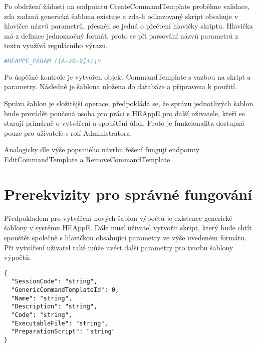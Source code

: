 Po obdržení žádosti na endpointu CreateCommandTemplate proběhne validace, zda zadaná generická šablona existuje a zda-li odkazovaný skript obsahuje v hlavičce názvů parametrů, přesněji se jedná o přečtení hlavičky skriptu. Hlavička má z definice jednoznačný formát, proto se při parsování názvů parametrů z textu využívá regulárního výrazu.


\begin{lstlisting}[language=bash, caption={Regurální výraz pro parsování názvů parametrů}]
                                #HEAPPE_PARAM ([A-z0-9]+)\n
\end{lstlisting}

Po úspěšné kontrole je vytvořen objekt CommandTemplate s vazbou na skript a parametry. Následně je šablona uložena do databáze a připravena k použití.

Správa šablon je složitější operace, předpokládá se, že správu jednotlivých šablon bude provádět poučená osoba pro práci s HEAppE pro další uživatele, kteří se starají primárně o vytváření a spouštění úloh. Proto je funkcionalita dostupná pouze pro uživatelé s rolí Administrátora.

Analogicky dle výše popsaného návrhu řešení fungují endpointy EditCommandTemplate a RemoveCommandTemplate.

\section{Prerekvizity pro správné fungování}
Předpokladem pro vytváření nových šablon výpočtů je existence generické šablony v systému HEAppE. Dále musí uživatel vytvořit skript, který bude chtít spouštět společně s hlavičkou obsahující parametry ve výše uvedeném formátu. Při vytváření uživatel také může uvést další parametry pro tvorbu šablony výpočtů.



\begin{lstlisting}[caption={JSON struktura pro endpoint CreateCommandTemplate}]
{
  "SessionCode": "string",
  "GenericCommandTemplateId": 0,
  "Name": "string",
  "Description": "string",
  "Code": "string",
  "ExecutableFile": "string",
  "PreparationScript": "string"
} 
\end{lstlisting}



